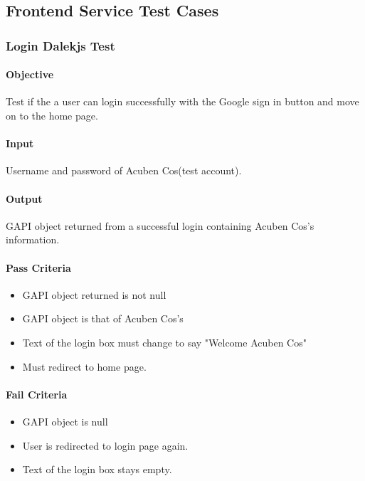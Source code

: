 \documentclass[hidelinks,english]{article}
\begin{document}
        \subsection{Frontend Service Test Cases}
			\subsubsection{Login Dalekjs Test}\label{frontendlogindalekjstest}
    			\paragraph{Objective} Test if the a user can login successfully with the Google sign in button and move on to the home page.
    			\paragraph{Input} Username and password of Acuben Cos(test account).
    			\paragraph{Output} GAPI object returned from a successful login containing Acuben Cos's information.
			    \paragraph{Pass Criteria}
				\begin{itemize}
				    \item GAPI object returned is not null
				    \item GAPI object is that of Acuben Cos's
				    \item Text of the login box must change to say "Welcome Acuben Cos"
				    \item Must redirect to home page.
				\end{itemize}
				\paragraph{Fail Criteria}
				\begin{itemize}
				    \item GAPI object is null
				    \item User is redirected to login page again.
				    \item Text of the login box stays empty.
				\end{itemize}
			
\end{document}
